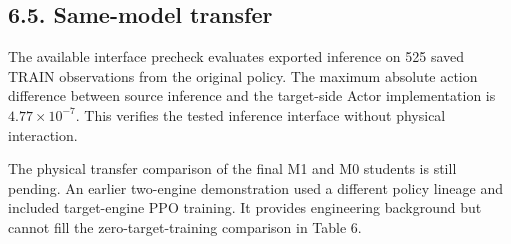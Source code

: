 \documentclass[
  american,
  11pt,
  a4paper,
]{article}
\begin{document}
\subsection{6.5. Same-model transfer}\label{same-model-transfer}

The available interface precheck evaluates exported inference on 525
saved TRAIN observations from the original policy. The maximum absolute
action difference between source inference and the target-side Actor
implementation is \(4.77\times10^{-7}\). This verifies the tested
inference interface without physical interaction.

The physical transfer comparison of the final M1 and M0 students is
still pending. An earlier two-engine demonstration used a different
policy lineage and included target-engine PPO training. It provides
engineering background but cannot fill the zero-target-training
comparison in Table 6.
\end{document}
